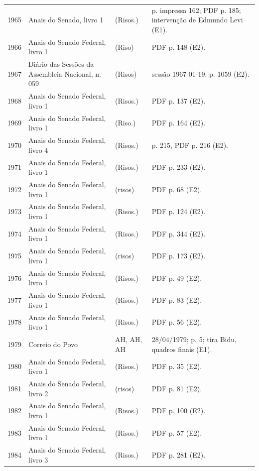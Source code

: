 \begin{longtable}{p{}p{}p{}p{}}
1965 & Anais do Senado, livro 1 \cite{senado1965} & (Risos.) & p. impressa 162; PDF p. 185; intervenção de Edmundo Levi (E1). \\
1966 & Anais do Senado Federal, livro 1 \cite{anual1966} & (Riso) & PDF p. 148 (E2). \\
1967 & Diário das Sessões da Assembleia Nacional, n. 059 \cite{anual1967} & (Risos) & sessão 1967-01-19; p. 1059 (E2). \\
1968 & Anais do Senado Federal, livro 1 \cite{anual1968} & (Risos.) & PDF p. 137 (E2). \\
1969 & Anais do Senado Federal, livro 1 \cite{anual1969} & (Riso.) & PDF p. 164 (E2). \\
1970 & Anais do Senado Federal, livro 4 \cite{anual1970} & (Risos.) & p. 215, PDF p. 216 (E2). \\
1971 & Anais do Senado Federal, livro 1 \cite{anual1971} & (Risos.) & PDF p. 233 (E2). \\
1972 & Anais do Senado Federal, livro 1 \cite{anual1972} & (risos) & PDF p. 68 (E2). \\
1973 & Anais do Senado Federal, livro 1 \cite{anual1973} & (Risos.) & PDF p. 124 (E2). \\
1974 & Anais do Senado Federal, livro 1 \cite{anual1974} & (Risos.) & PDF p. 344 (E2). \\
1975 & Anais do Senado Federal, livro 1 \cite{anual1975} & (risos) & PDF p. 173 (E2). \\
1976 & Anais do Senado Federal, livro 1 \cite{anual1976} & (Risos.) & PDF p. 49 (E2). \\
1977 & Anais do Senado Federal, livro 1 \cite{anual1977} & (Risos.) & PDF p. 83 (E2). \\
1978 & Anais do Senado Federal, livro 1 \cite{anual1978} & (Risos.) & PDF p. 56 (E2). \\
1979 & Correio do Povo \cite{correio1979} & AH, AH, AH & 28/04/1979; p. 5; tira Bidu, quadros finais (E1). \\
1980 & Anais do Senado Federal, livro 1 \cite{anual1980} & (Risos.) & PDF p. 35 (E2). \\
1981 & Anais do Senado Federal, livro 2 \cite{anual1981} & (risos) & PDF p. 81 (E2). \\
1982 & Anais do Senado Federal, livro 1 \cite{anual1982} & (Risos.) & PDF p. 100 (E2). \\
1983 & Anais do Senado Federal, livro 1 \cite{anual1983} & (Risos.) & PDF p. 57 (E2). \\
1984 & Anais do Senado Federal, livro 3 \cite{anual1984} & (Risos.) & PDF p. 281 (E2). \\

\end{longtable}
